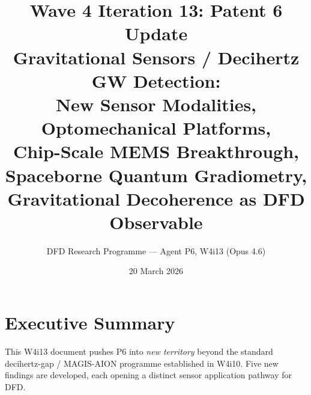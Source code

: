 \documentclass[11pt]{article}
\title{\textbf{Wave 4 Iteration 13: Patent 6 Update}\\[6pt]
Gravitational Sensors / Decihertz GW Detection:\\
New Sensor Modalities, Optomechanical Platforms,\\
Chip-Scale MEMS Breakthrough, Spaceborne Quantum Gradiometry,\\
Gravitational Decoherence as DFD Observable}
\author{DFD Research Programme --- Agent P6, W4i13 (Opus 4.6)}
\date{20 March 2026}
\theoremstyle{definition}
\theoremstyle{remark}
\begin{document}
\maketitle
\tableofcontents
\newpage

\section*{Executive Summary}

This W4i13 document pushes P6 into \emph{new territory} beyond the standard
decihertz-gap / MAGIS-AION programme established in W4i10. Five new findings
are developed, each opening a distinct sensor application pathway for DFD.
\end{document}
